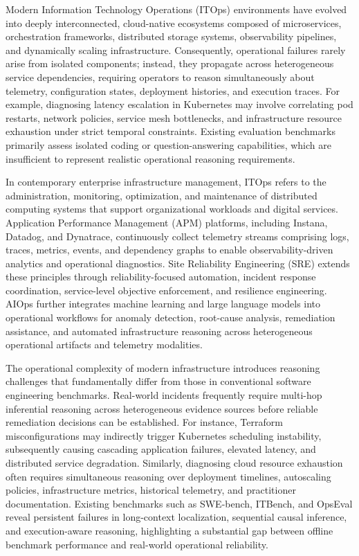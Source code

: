 \documentclass[conference]{IEEEtran}
\begin{document}
Modern Information Technology Operations (ITOps) environments have evolved into deeply interconnected, cloud-native ecosystems composed of microservices, orchestration frameworks, distributed storage systems, observability pipelines, and dynamically scaling infrastructure. Consequently, operational failures rarely arise from isolated components; instead, they propagate across heterogeneous service dependencies, requiring operators to reason simultaneously about telemetry, configuration states, deployment histories, and execution traces. For example, diagnosing latency escalation in Kubernetes may involve correlating pod restarts, network policies, service mesh bottlenecks, and infrastructure resource exhaustion under strict temporal constraints. Existing evaluation benchmarks primarily assess isolated coding or question-answering capabilities, which are insufficient to represent realistic operational reasoning requirements.

In contemporary enterprise infrastructure management, ITOps refers to the administration, monitoring, optimization, and maintenance of distributed computing systems that support organizational workloads and digital services. Application Performance Management (APM) platforms, including Instana, Datadog, and Dynatrace, continuously collect telemetry streams comprising logs, traces, metrics, events, and dependency graphs to enable observability-driven analytics and operational diagnostics. Site Reliability Engineering (SRE) extends these principles through reliability-focused automation, incident response coordination, service-level objective enforcement, and resilience engineering. AIOps further integrates machine learning and large language models into operational workflows for anomaly detection, root-cause analysis, remediation assistance, and automated infrastructure reasoning across heterogeneous operational artifacts and telemetry modalities.

The operational complexity of modern infrastructure introduces reasoning challenges that fundamentally differ from those in conventional software engineering benchmarks. Real-world incidents frequently require multi-hop inferential reasoning across heterogeneous evidence sources before reliable remediation decisions can be established. For instance, Terraform misconfigurations may indirectly trigger Kubernetes scheduling instability, subsequently causing cascading application failures, elevated latency, and distributed service degradation. Similarly, diagnosing cloud resource exhaustion often requires simultaneous reasoning over deployment timelines, autoscaling policies, infrastructure metrics, historical telemetry, and practitioner documentation. Existing benchmarks such as SWE-bench, ITBench, and OpsEval reveal persistent failures in long-context localization, sequential causal inference, and execution-aware reasoning, highlighting a substantial gap between offline benchmark performance and real-world operational reliability.
\end{document}
